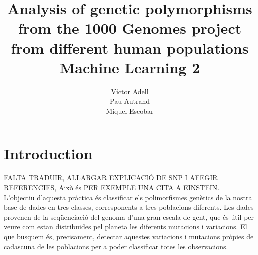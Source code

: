 \documentclass[a4paper, 11pt]{article}
\theoremstyle{definition}
\theoremstyle{remark}
\begin{document}




\title{
\textbf{Analysis of genetic polymorphisms from the 1000 Genomes project from different human populations}\\
\vspace{2cm}
Machine Learning 2
\vspace{2cm}
}

\author{
Víctor Adell \\
Pau Autrand \\
Miquel Escobar\\
\vspace{1cm}
}


\clearpage
\maketitle
\thispagestyle{empty}

\newpage
\clearpage






\renewcommand{\cfttoctitlefont}{\Large\bfseries}
\setlength\cftaftertoctitleskip{20pt}
\setlength\cftbeforesecskip{10pt}

\thispagestyle{plain}
\setcounter{page}{2}

\tableofcontents
\newpage
\clearpage






\section{Introduction}

FALTA TRADUIR, ALLARGAR EXPLICACIÓ DE SNP I AFEGIR REFERENCIES, Això és PER EXEMPLE UNA CITA \cite{einstein} A EINSTEIN.\\

L’objectiu d’aquesta pràctica és classificar els polimorfismes genètics de la nostra base de dades en tres classes, corresponents a tres poblacions diferents. Les dades provenen de la seqüenciació del genoma d’una gran escala de gent, que és útil per veure com estan distribuides pel planeta les diferents mutacions i variacions. El que busquem és, precisament, detectar aquestes variacions i mutacions pròpies de cadascuna de les poblacions per a poder classificar totes les observacions.
\end{document}
